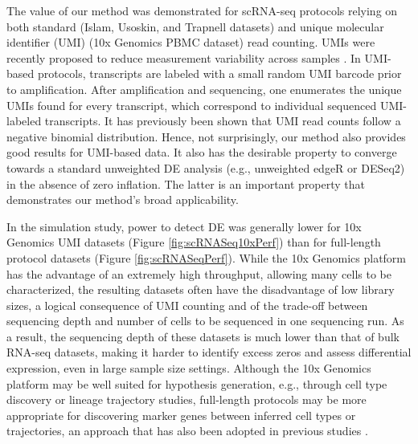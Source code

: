 \documentclass{bmcart}
\newcommand{\RPack}[1]{\textsf{#1}}
\begin{document}
The value of our method was demonstrated for scRNA-seq protocols relying on both standard (Islam, Usoskin, and Trapnell datasets) and unique molecular identifier (UMI) (10x Genomics PBMC dataset) read counting. UMIs were recently proposed to reduce measurement variability across samples \citep{Islam2013}. In UMI-based protocols, transcripts are labeled with a small random UMI barcode prior to amplification. After amplification and sequencing, one enumerates the unique UMIs found for every transcript, which correspond to individual sequenced UMI-labeled transcripts. It has previously been shown \citep{Grun2014} that UMI read counts follow a negative binomial distribution. Hence, not surprisingly, our method also provides good results for UMI-based data. It also has the desirable property to converge towards a standard unweighted DE analysis (e.g., unweighted \RPack{edgeR} or \RPack{DESeq2}) in the absence of zero inflation. The latter is an important property that demonstrates our method's broad applicability.

In the simulation study, power to detect DE was generally lower for 10x Genomics UMI datasets (Figure \ref{fig:scRNASeq10xPerf}) than for full-length protocol datasets (Figure \ref{fig:scRNASeqPerf}).
While the 10x Genomics platform has the advantage of an extremely high throughput, allowing many cells to be characterized, the resulting datasets often have the disadvantage of low library sizes, a logical consequence of UMI counting and of the trade-off between sequencing depth and number of cells to be sequenced in one sequencing run. As a result, the sequencing depth of these datasets is much lower than that of bulk RNA-seq datasets, making it harder to identify excess zeros and assess differential expression, even in large sample size settings.
Although the 10x Genomics platform may be well suited for hypothesis generation, e.g., through cell type discovery or lineage trajectory studies, full-length protocols may be more appropriate for discovering marker genes between inferred cell types or trajectories, an approach that has also been adopted in previous studies \citep{Pal2017}.
\end{document}
